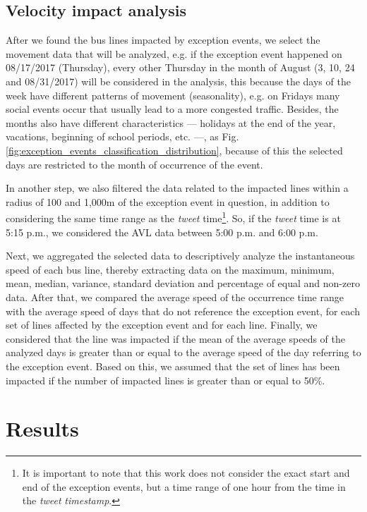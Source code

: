 \documentclass[runningheads]{llncs}
\begin{document}
\subsection{Velocity impact analysis}

After we found the bus lines impacted by exception events, we select the movement data that will be analyzed, e.g. if the exception event happened on 08/17/2017 (Thursday), every other Thursday in the month of August (3, 10, 24 and 08/31/2017) will be considered in the analysis, this because the days of the week have different patterns of movement (seasonality), e.g. on Fridays many social events occur that usually lead to a more congested traffic. Besides, the months also have different characteristics --- holidays at the end of the year, vacations, beginning of school periods, etc. ---, as Fig. \ref{fig:exception_events_classification_distribution}, because of this the selected days are restricted to the month of occurrence of the event.

In another step, we also filtered the data related to the impacted lines within a radius of 100 and 1,000m of the exception event in question, in addition to considering the same time range as the \textit{tweet} time\footnote{It is important to note that this work does not consider the exact start and end of the exception events, but a time range of one hour from the time in the \textit{tweet} \textit{timestamp}.}. So, if the \textit {tweet} time is at 5:15 p.m., we considered the AVL data between 5:00 p.m. and 6:00 p.m.

Next, we aggregated the selected data to descriptively analyze the instantaneous speed of each bus line, thereby extracting data on the maximum, minimum, mean, median, variance, standard deviation and percentage of equal and non-zero data. After that, we compared the average speed of the occurrence time range with the average speed of days that do not reference the exception event, for each set of lines affected by the exception event and for each line. Finally, we considered that the line was impacted if the mean of the average speeds of the analyzed days is greater than or equal to the average speed of the day referring to the exception event. Based on this, we assumed that the set of lines has been impacted if the number of impacted lines is greater than or equal to 50\%.

\section{Results}
\end{document}
